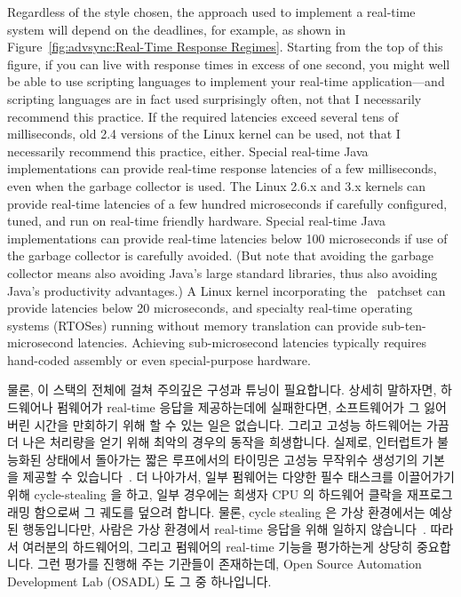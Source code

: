 Regardless of the style chosen, the approach used to implement a real-time
system will depend on the deadlines, for example, as shown in
Figure~\ref{fig:advsync:Real-Time Response Regimes}.
Starting from the top of this figure, if you can live with response times in
excess of one second, you might well be able to use scripting languages
to implement your real-time application---and scripting languages are
in fact used surprisingly often, not that I necessarily recommend this
practice.
If the required latencies exceed several tens of milliseconds,
old 2.4 versions of the Linux kernel can be used, not that I necessarily
recommend this practice, either.
Special real-time Java implementations can provide real-time response
latencies of a few milliseconds, even when the garbage collector is
used.
The Linux 2.6.x and 3.x kernels can provide real-time latencies of
a few hundred microseconds if carefully configured, tuned, and run
on real-time friendly hardware.
Special real-time Java implementations can provide real-time latencies
below 100 microseconds if use of the garbage collector is carefully avoided.
(But note that avoiding the garbage collector means also avoiding
Java's large standard libraries, thus also avoiding Java's productivity
advantages.)
A Linux kernel incorporating the \rt\ patchset can provide latencies
below 20 microseconds, and specialty real-time operating systems (RTOSes)
running without memory translation can provide sub-ten-microsecond
latencies.
Achieving sub-microsecond latencies typically requires hand-coded assembly
or even special-purpose hardware.
\fi

물론, 이 스택의 전체에 걸쳐 주의깊은 구성과 튜닝이 필요합니다.
상세히 말하자면, 하드웨어나 펌웨어가 real-time 응답을 제공하는데에 실패한다면,
소프트웨어가 그 잃어버린 시간을 만회하기 위해 할 수 있는 일은 없습니다.
그리고 고성능 하드웨어는 가끔 더 나은 처리량을 얻기 위해 최악의 경우의 동작을
희생합니다.
실제로, 인터럽트가 불능화된 상태에서 돌아가는 짧은 루프에서의 타이밍은 고성능
무작위수 생성기의 기본을 제공할 수
있습니다~\cite{PeterOkech2009InherentRandomness}.
더 나아가서, 일부 펌웨어는 다양한 필수 태스크를 이끌어가기 위해 cycle-stealing
을 하고, 일부 경우에는 희생자 CPU 의 하드웨어 클락을 재프로그래밍 함으로써 그
궤도를 덮으려 합니다.
물론, cycle stealing 은 가상 환경에서는 예상된 행동입니다만, 사람은 가상
환경에서 real-time 응답을 위해 일하지
않습니다~\cite{ThomasGleixner2012KVMrealtime,JanKiszka2014virtRT}.
따라서 여러분의 하드웨어의, 그리고 펌웨어의 real-time 기능을 평가하는게 상당히
중요합니다.
그런 평가를 진행해 주는 기관들이 존재하는데, Open Source Automation Development
Lab (OSADL) 도 그 중 하나입니다.
\iffalse

